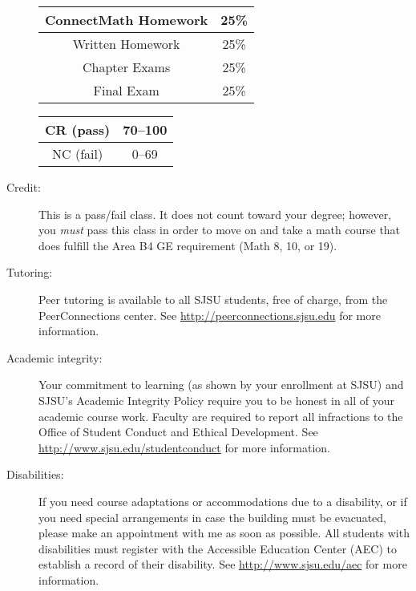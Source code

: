\documentclass[letterpaper,12pt,fleqn]{article}
\begin{document}
\begin{description}
  \bigskip

  \begin{minipage}{3in}
    \begin{tabular}{|c|c|}
      \hline
      ConnectMath Homework & 25\% \\
      \hline
      Written Homework & 25\% \\
      \hline
      Chapter Exams & 25\% \\
      \hline
      Final Exam & 25\% \\
      \hline
    \end{tabular}
  \end{minipage}
  \begin{minipage}{3in}
    \begin{tabular}{|c|c|}
      \hline
      CR (pass) & 70--100 \\
      \hline
      NC (fail) & 0--69 \\
      \hline
    \end{tabular}
  \end{minipage}

  \bigskip
  
\item[Credit:] This is a pass/fail class. It does not count toward your degree;
  however, you \emph{must} pass this class in order to move on and take a math
  course that does fulfill the Area B4 GE requirement (Math 8, 10, or 19).

\item[Tutoring:] Peer tutoring is available to all SJSU students, free of
    charge, from the PeerConnections center. See
    \url{http://peerconnections.sjsu.edu} for more information.

\item[Academic integrity:] Your commitment to learning (as shown by your
    enrollment at SJSU) and SJSU's Academic Integrity Policy require you to be
    honest in all of your academic course work.  Faculty are required to report
    all infractions to the Office of Student Conduct and Ethical Development.
    See \url{http://www.sjsu.edu/studentconduct} for more information.

\item[Disabilities:] If you need course adaptations or accommodations due to a
    disability, or if you need special arrangements in case the building must
    be evacuated, please make an appointment with me as soon as possible. All
    students with disabilities must register with the Accessible Education
    Center (AEC) to establish a record of their disability. See
    \url{http://www.sjsu.edu/aec} for more information.

\end{description}
\end{document}
